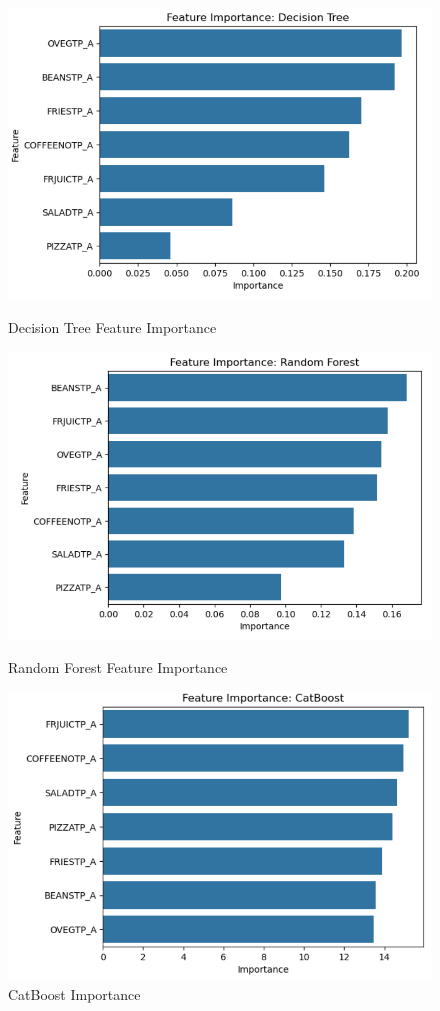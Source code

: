 \documentclass{article}
\begin{document}
\begin{figure}[h!]
	\centering
	\begin{minipage}{0.32\textwidth}
		\centering
		\includegraphics[width=0.9\linewidth]{../Image/P41.jpg}
		\caption{Decision Tree Feature Importance}
		\label{fig:P41}
	\end{minipage}\hfill
	\begin{minipage}{0.32\textwidth}
		\centering
		\includegraphics[width=0.9\linewidth]{../Image/P42.jpg}
		\caption{Random Forest Feature Importance}
		\label{fig:P42}
	\end{minipage}\hfill
	\begin{minipage}{0.32\textwidth}
		\centering
		\includegraphics[width=0.9\linewidth]{../Image/P43.jpg}
		\caption{CatBoost Importance}
		\label{fig:P43}
	\end{minipage}
\end{figure}
\end{document}
